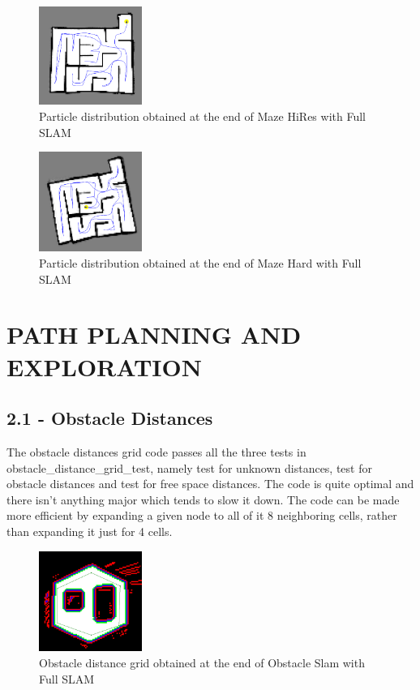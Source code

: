 \documentclass[journal,onecolumn]{IEEEtran}
\begin{document}
\begin{figure}[H]
\centering
\includegraphics[width=0.3\textwidth]{Media/133.png}
\caption{Particle distribution obtained at the end of Maze HiRes with Full SLAM}
\end{figure}

\begin{figure}[H]
\centering
\includegraphics[width=0.3\textwidth]{Media/134.png}
\caption{Particle distribution obtained at the end of Maze Hard with Full SLAM}
\end{figure}

\section{PATH PLANNING AND EXPLORATION}

\subsection*{2.1 - Obstacle Distances} 

The obstacle distances grid code passes all the three tests in obstacle\_distance\_grid\_test, namely test for unknown distances, test for obstacle distances and test for free space distances. The code is quite optimal and there isn't anything major which tends to slow it down. The code can be made more efficient by expanding a given node to all of it 8 neighboring cells, rather than expanding it just for 4 cells.

\begin{figure}[H]
\centering
\includegraphics[width=0.3\textwidth]{Media/21.png}
\caption{Obstacle distance grid obtained at the end of Obstacle Slam with Full SLAM}
\end{figure}
\end{document}
